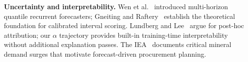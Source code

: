 \textbf{Uncertainty and interpretability.}
Wen et al.~\cite{wen2017quantile} introduced multi-horizon
quantile recurrent forecasters; Gneiting and
Raftery~\cite{gneiting2007scoring} establish the theoretical
foundation for calibrated interval scoring. Lundberg and
Lee~\cite{lundberg2017shap} argue for post-hoc attribution; our
$\alpha$ trajectory provides built-in training-time
interpretability without additional explanation passes. The
IEA~\cite{iea2024minerals} documents critical mineral demand
surges that motivate forecast-driven procurement planning.
